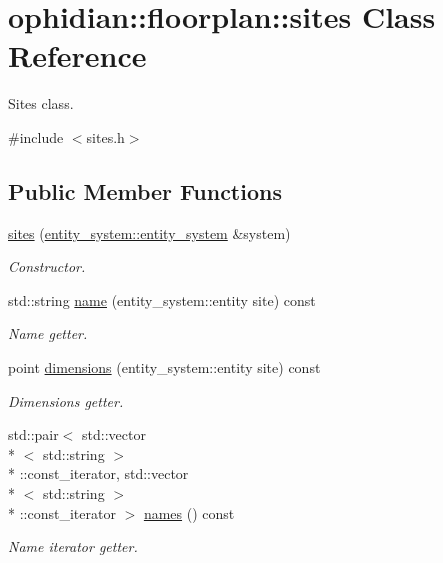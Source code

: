 \hypertarget{classophidian_1_1floorplan_1_1sites}{\section{ophidian\-:\-:floorplan\-:\-:sites Class Reference}
\label{classophidian_1_1floorplan_1_1sites}
}


Sites class.  




{\ttfamily \#include $<$sites.\-h$>$}

\subsection*{Public Member Functions}
\begin{DoxyCompactItemize}
\item 
\hyperlink{classophidian_1_1floorplan_1_1sites_a1491b5143f884e055af2237672eb831e}{sites} (\hyperlink{classophidian_1_1entity__system_1_1entity__system}{entity\-\_\-system\-::entity\-\_\-system} \&system)
\begin{DoxyCompactList}\small\item\em Constructor. \end{DoxyCompactList}\item 
std\-::string \hyperlink{classophidian_1_1floorplan_1_1sites_a29827e155ac9dc999e9fb79a499176d5}{name} (entity\-\_\-system\-::entity site) const 
\begin{DoxyCompactList}\small\item\em Name getter. \end{DoxyCompactList}\item 
point \hyperlink{classophidian_1_1floorplan_1_1sites_a4b93e80224ecb35489fbf38d16930430}{dimensions} (entity\-\_\-system\-::entity site) const 
\begin{DoxyCompactList}\small\item\em Dimensions getter. \end{DoxyCompactList}\item 
std\-::pair$<$ std\-::vector\\*
$<$ std\-::string $>$\\*
\-::const\-\_\-iterator, std\-::vector\\*
$<$ std\-::string $>$\\*
\-::const\-\_\-iterator $>$ \hyperlink{classophidian_1_1floorplan_1_1sites_abcd874e49de890637581e8b192274b5e}{names} () const 
\begin{DoxyCompactList}\small\item\em Name iterator getter. \end{DoxyCompactList}\item 

\end{DoxyCompactItemize}
